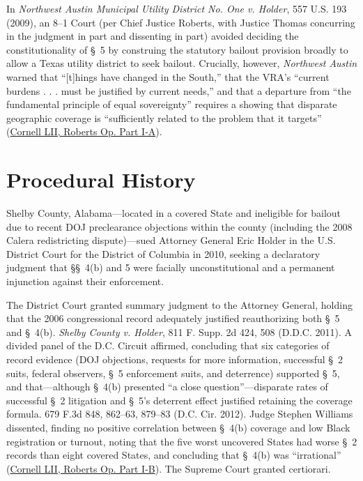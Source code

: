 \documentclass[12pt]{article}
\begin{document}
In \emph{Northwest Austin Municipal Utility District No. One v. Holder}, 557 U.S. 193 (2009), an 8--1 Court (per Chief Justice Roberts, with Justice Thomas concurring in the judgment in part and dissenting in part) avoided deciding the constitutionality of \S~5 by construing the statutory bailout provision broadly to allow a Texas utility district to seek bailout. Crucially, however, \emph{Northwest Austin} warned that ``[t]hings have changed in the South,'' that the VRA's ``current burdens . . . must be justified by current needs,'' and that a departure from ``the fundamental principle of equal sovereignty'' requires a showing that disparate geographic coverage is ``sufficiently related to the problem that it targets'' (\href{https://www.law.cornell.edu/supremecourt/text/12-96}{Cornell LII, Roberts Op. Part I-A}).

\section{Procedural History}
Shelby County, Alabama---located in a covered State and ineligible for bailout due to recent DOJ preclearance objections within the county (including the 2008 Calera redistricting dispute)---sued Attorney General Eric Holder in the U.S. District Court for the District of Columbia in 2010, seeking a declaratory judgment that \S\S~4(b) and 5 were facially unconstitutional and a permanent injunction against their enforcement.

The District Court granted summary judgment to the Attorney General, holding that the 2006 congressional record adequately justified reauthorizing both \S~5 and \S~4(b). \emph{Shelby County v. Holder}, 811 F. Supp. 2d 424, 508 (D.D.C. 2011). A divided panel of the D.C. Circuit affirmed, concluding that six categories of record evidence (DOJ objections, requests for more information, successful \S~2 suits, federal observers, \S~5 enforcement suits, and deterrence) supported \S~5, and that---although \S~4(b) presented ``a close question''---disparate rates of successful \S~2 litigation and \S~5's deterrent effect justified retaining the coverage formula. 679 F.3d 848, 862--63, 879--83 (D.C. Cir. 2012). Judge Stephen Williams dissented, finding no positive correlation between \S~4(b) coverage and low Black registration or turnout, noting that the five worst uncovered States had worse \S~2 records than eight covered States, and concluding that \S~4(b) was ``irrational'' (\href{https://www.law.cornell.edu/supremecourt/text/12-96}{Cornell LII, Roberts Op. Part I-B}). The Supreme Court granted certiorari.
\end{document}
